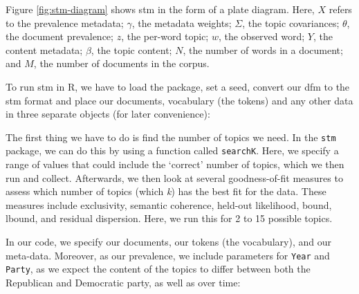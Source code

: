 \documentclass[
]{book}
\newenvironment{Shaded}{\begin{snugshade}}{\end{snugshade}}
\newcommand{\AttributeTok}[1]{\textcolor[rgb]{0.13,0.29,0.53}{#1}}
\newcommand{\DecValTok}[1]{\textcolor[rgb]{0.00,0.00,0.81}{#1}}
\newcommand{\FunctionTok}[1]{\textcolor[rgb]{0.13,0.29,0.53}{\textbf{#1}}}
\newcommand{\NormalTok}[1]{#1}
\newcommand{\OtherTok}[1]{\textcolor[rgb]{0.56,0.35,0.01}{#1}}
\newcommand{\SpecialCharTok}[1]{\textcolor[rgb]{0.81,0.36,0.00}{\textbf{#1}}}
\newcommand{\StringTok}[1]{\textcolor[rgb]{0.31,0.60,0.02}{#1}}
\begin{document}
\hfill\break

Figure \ref{fig:stm-diagram} shows stm in the form of a plate diagram. Here, \(X\) refers to the prevalence metadata; \(\gamma\), the metadata weights; \(\Sigma\), the topic covariances; \(\theta\), the document prevalence; \(z\), the per-word topic; \(w\), the observed word; \(Y\), the content metadata; \(\beta\), the topic content; \(N\), the number of words in a document; and \(M\), the number of documents in the corpus.

To run stm in R, we have to load the package, set a seed, convert our dfm to the stm format and place our documents, vocabulary (the tokens) and any other data in three separate objects (for later convenience):

\begin{Shaded}
\end{Shaded}

The first thing we have to do is find the number of topics we need. In the \texttt{stm} package, we can do this by using a function called \texttt{searchK}. Here, we specify a range of values that could include the `correct' number of topics, which we then run and collect. Afterwards, we then look at several goodness-of-fit measures to assess which number of topics (which \emph{k}) has the best fit for the data. These measures include exclusivity, semantic coherence, held-out likelihood, bound, lbound, and residual dispersion. Here, we run this for 2 to 15 possible topics.

In our code, we specify our documents, our tokens (the vocabulary), and our meta-data. Moreover, as our prevalence, we include parameters for \texttt{Year} and \texttt{Party}, as we expect the content of the topics to differ between both the Republican and Democratic party, as well as over time:
\end{document}
